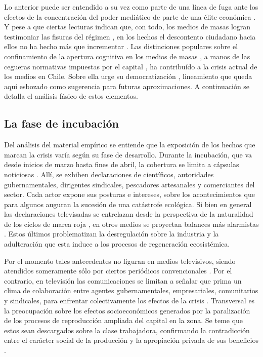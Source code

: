 \documentclass{textolivre}
\begin{document}
Lo anterior puede ser entendido a su vez como parte de una línea de fuga ante los
efectos de la concentración del poder mediático de parte de una élite económica
\cite{sapiezynska2013}. Y pese a que ciertas lecturas indican que,
con todo, los medios de masas logran testimoniar las fisuras del régimen \cite{billi2017},
en los hechos el descontento ciudadano hacia ellos no ha
hecho más que incrementar \cite{almeida}. Las distinciones populares sobre
el confinamiento de la apertura cognitiva en los medios de masas \cite{Tkke2010}, 
a manos de las cegueras normativas impuestas por el capital \cite{mosco2016}, 
ha contribuído a la crisis actual de los medios en Chile. Sobre ella urge su
democratización \cite{cardenas2019}, lineamiento que queda aquí esbozado como
sugerencia para futuras aproximaciones. A continuación se detalla el análisis fásico de
estos elementos.



\subsection{La fase de incubación}\label{sec-fase-incu}

Del análisis del material empírico se entiende que la exposición de los hechos que
marcan la crisis varía según su fase de desarrollo. Durante la incubación, que va desde
inicios de marzo hasta fines de abril, la cobertura se limita a cápsulas noticiosas
\cite{burrows2016}. Allí, se exhiben declaraciones de científicos, autoridades
gubernamentales, dirigentes sindicales, pescadores artesanales y comerciantes del
sector. Cada actor expone sus posturas e intereses, sobre los acontecimientos que para
algunos auguran la sucesión de una catástrofe ecológica. Si bien en general las
declaraciones televisadas se entrelazan desde la perspectiva de la naturalidad de los
ciclos de marea roja \cite{cabello2018}, en otros medios se
proyectan balances más alarmistas \cite{desconcierto}. Estos últimos
problematizan la desregulación sobre la industria y la adulteración que esta induce a los
procesos de regeneración ecosistémica.

Por el momento tales antecedentes no figuran en medios televisivos, siendo
atendidos someramente sólo por ciertos periódicos convencionales \cite{tercera}.
Por el contrario, en televisión las comunicaciones se limitan a señalar que prima un clima
de colaboración entre agentes gubernamentales, empresariales, comunitarios y
sindicales, para enfrentar colectivamente los efectos de la crisis \cite{burrows2016}.
Transversal es la preocupación sobre los efectos socioeconómicos generados por la
paralización de los procesos de reproducción ampliada del capital en la zona. Se teme
que estos sean descargados sobre la clase trabajadora, confirmando la contradicción
entre el carácter social de la producción y la apropiación privada de sus beneficios
\cite{wallerstein}.
\end{document}
